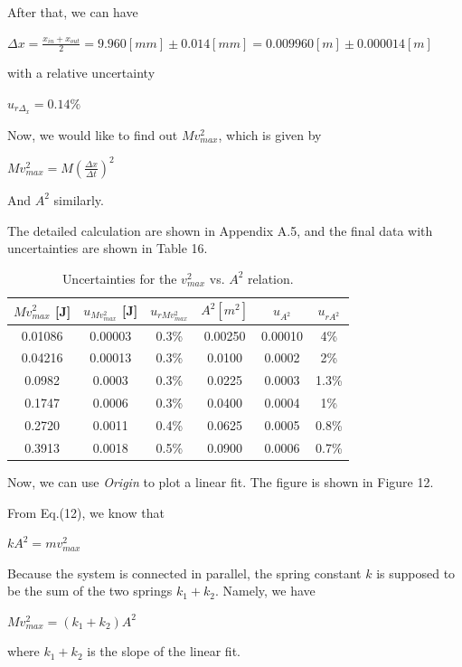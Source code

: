 \documentclass[a4paper,12pt]{article}
\begin{document}
\par After that, we can have
\begin{center}
$\displaystyle \Delta x = \frac{x_{in} + x_{out}}{2} = 9.960 [mm] \pm 0.014 [mm] = 0.009960 [m] \pm 0.000014[m]$
\end{center}
with a relative uncertainty 
\begin{center}
$\displaystyle u_{r\Delta_x} = 0.14\%$
\end{center}
Now, we would like to find out $Mv_{max}^2$, which is given by
\begin{center}
$\displaystyle Mv_{max}^2 = M(\frac{\Delta x}{\Delta t})^2$
\end{center}
And $A^2$ similarly.
\par The detailed calculation are shown in Appendix A.5, and the final data with uncertainties are shown in Table 16.

\begin{table}[h]
\begin{center}
\begin{tabular}{|c|c|c||c|c|c|}
\hline
$ Mv_{max}^2 $ [J] & $u_{Mv_{max}^2}$ [J] & $u_{rMv_{max}^2}$ & $A^2 [m^2]$ & $ u_{A^2} $ & $ u_{rA^2}$ \\
\hline
0.01086 & 0.00003 &  0.3\%  & 0.00250 & 0.00010 & 4\%\\
0.04216 & 0.00013 &  0.3\%  & 0.0100 & 0.0002 & 2\%\\
0.0982 & 0.0003 &  0.3\%  & 0.0225 & 0.0003 & 1.3\%\\
0.1747 & 0.0006 &  0.3\%  & 0.0400 & 0.0004 & 1\%\\
0.2720 & 0.0011 &  0.4\%  & 0.0625 & 0.0005 & 0.8\%\\
0.3913 & 0.0018 &  0.5\%  & 0.0900 & 0.0006 & 0.7\%\\
\hline
\end{tabular}
\end{center}
\caption{Uncertainties for the $v_{max}^2$ vs. $A^2$ relation.}
\end{table}

\par Now, we can use \textit{Origin} to plot a linear fit. The figure is shown in Figure 12.
\par From Eq.(12), we know that 
\begin{center}
$k A^2 = mv_{max}^2$
\end{center}
Because the system is connected in parallel, the spring constant $k$ is supposed to be the sum of the two springs $k_1 + k_2$. Namely, we have
\begin{center}
$ Mv_{max}^2 = (k_1 + k_2)A^2 $
\end{center}
where $k_1+k_2$ is the slope of the linear fit.
\end{document}
